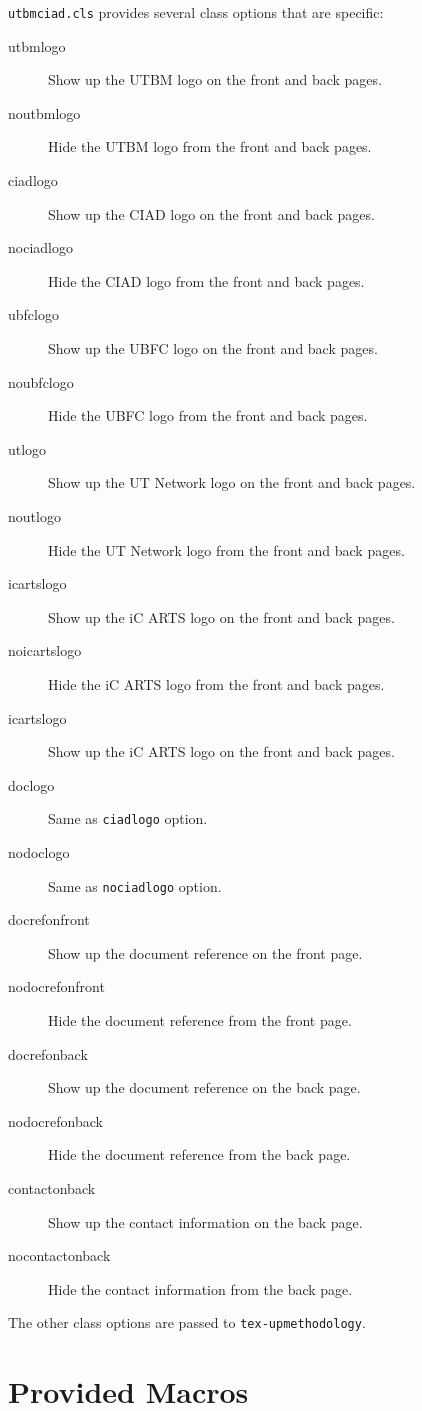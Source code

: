 \documentclass[article]{upmethodology-document}
\begin{document}
\texttt{utbmciad.cls} provides several class options that are specific:
\begin{description}
\item[utbmlogo] Show up the UTBM logo on the front and back pages.
\item[noutbmlogo] Hide the UTBM logo from the front and back pages.
\item[ciadlogo] Show up the CIAD logo on the front and back pages.
\item[nociadlogo] Hide the CIAD logo from the front and back pages.
\item[ubfclogo] Show up the UBFC logo on the front and back pages.
\item[noubfclogo] Hide the UBFC logo from the front and back pages.
\item[utlogo] Show up the UT Network logo on the front and back pages.
\item[noutlogo] Hide the UT Network logo from the front and back pages.
\item[icartslogo] Show up the iC ARTS logo on the front and back pages.
\item[noicartslogo] Hide the iC ARTS logo from the front and back pages.
\item[icartslogo] Show up the iC ARTS logo on the front and back pages.
\item[doclogo] Same as \texttt{ciadlogo} option.
\item[nodoclogo] Same as \texttt{nociadlogo} option.
\item[docrefonfront] Show up the document reference on the front page.
\item[nodocrefonfront] Hide the document reference from the front page.
\item[docrefonback] Show up the document reference on the back page.
\item[nodocrefonback] Hide the document reference from the back page.
\item[contactonback] Show up the contact information on the back page.
\item[nocontactonback] Hide the contact information from the back page.
\end{description}

The other class options are passed to \texttt{tex-upmethodology}.

\section{Provided Macros}
\end{document}
